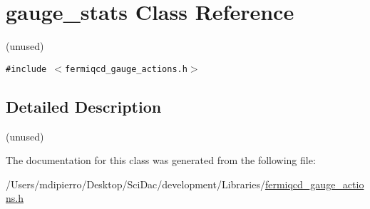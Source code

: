 \hypertarget{classgauge__stats}{
\section{gauge\_\-stats Class Reference}
\label{classgauge__stats}
}
(unused)  


{\tt \#include $<$fermiqcd\_\-gauge\_\-actions.h$>$}



\subsection{Detailed Description}
(unused) 

The documentation for this class was generated from the following file:\begin{CompactItemize}
\item 
/Users/mdipierro/Desktop/SciDac/development/Libraries/\hyperlink{fermiqcd__gauge__actions_8h}{fermiqcd\_\-gauge\_\-actions.h}\end{CompactItemize}
